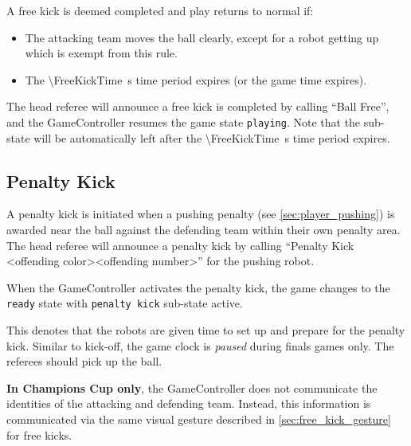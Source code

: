 A free kick is deemed completed and play returns to normal if:
\begin{itemize}
  \item The attacking team moves the ball clearly, except for a robot getting up which is exempt from this rule.
  \item The \qty{\FreeKickTime}{\second} time period expires (or the game time expires).
\end{itemize}
The head referee will announce a free kick is completed by calling ``Ball Free'', and the GameController resumes the game state \texttt{playing}.
Note that the sub-state will be automatically left after the \qty{\FreeKickTime}{\second} time period expires.

\subsection{Penalty Kick}
\label{sec:penalty_kick}

A penalty kick is initiated when a pushing penalty (see \cref{sec:player_pushing}) is awarded near the ball against the defending team within their own penalty area.
The head referee will announce a penalty kick by calling ``Penalty Kick \textless offending color\textgreater \textless offending number\textgreater'' for the pushing robot.

When the GameController activates the penalty kick, the game changes to the \texttt{ready} state with \texttt{penalty kick} sub-state active.

This denotes that the robots are given time to set up and prepare for the penalty kick.
Similar to kick-off, the game clock is \textit{paused} during finals games only.
The referees should pick up the ball.

\textbf{In Champions Cup only}, the GameController does not communicate the identities of the attacking and defending team.
Instead, this information is communicated via the same visual gesture described in \cref{sec:free_kick_gesture} for free kicks.

